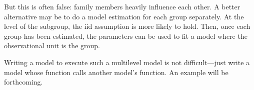 But this is often false: family members heavily influence each other.
A better alternative may be to do a model estimation for each group
separately. At the level of the subgroup, the iid assumption is more
likely to hold. Then, once each group has been estimated, the parameters
can be used to fit a model where the observational unit is the group.

Writing a model to execute such a multilevel model is not
difficult---just write a model whose  function calls
another model's  function. 
An example will be forthcoming.

